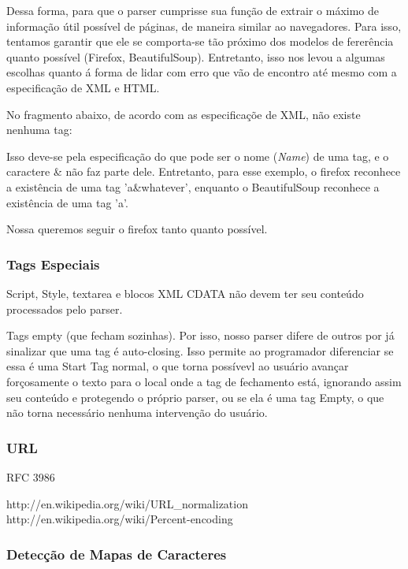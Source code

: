 \documentclass[10pt,twocolumn]{article}
\begin{document}
Dessa forma, para que o parser cumprisse sua função de extrair o máximo de
informação útil possível de páginas, de maneira similar ao navegadores. Para
isso, tentamos garantir que ele se comporta-se tão próximo dos modelos de
fererência quanto possível (Firefox, BeautifulSoup). Entretanto, isso nos levou
a algumas escolhas quanto á forma de lidar com erro que vão de encontro até
mesmo com a especificação de XML e HTML.

No fragmento abaixo, de acordo com as especificaçõe de XML, não existe nenhuma tag:

Isso deve-se pela especificação do que pode ser o nome (\emph{Name}) de uma
tag, e o caractere \& não faz parte dele. Entretanto, para esse exemplo, o
firefox reconhece a existência de uma tag 'a\&whatever', enquanto o
BeautifulSoup reconhece a existência de uma tag 'a'.

Nossa queremos seguir o firefox tanto quanto possível.

\subsubsection{Tags Especiais}

Script, Style, textarea e blocos XML CDATA não devem ter seu conteúdo
processados pelo parser.

Tags empty (que fecham sozinhas). Por isso, nosso parser difere de outros por
já sinalizar que uma tag é auto-closing. Isso permite ao programador
diferenciar se essa é uma Start Tag normal, o que torna possívevl ao usuário
avançar forçosamente o texto para o local onde a tag de fechamento está,
ignorando assim seu conteúdo e protegendo o próprio parser, ou se ela é uma tag
Empty, o que não torna necessário nenhuma intervenção do usuário.

\subsubsection{URL}

RFC 3986

http://en.wikipedia.org/wiki/URL\_normalization
http://en.wikipedia.org/wiki/Percent-encoding




\subsubsection{Detecção de Mapas de Caracteres}
\end{document}
